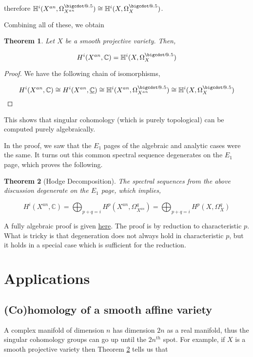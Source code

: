\documentclass[a4paper]{article}
\makeatletter
\newcommand{\C}{\mathbb{C}}
\newcommand*\bigcdot{\mathpalette\bigcdot@{.5}}
\newcommand*\bigcdot@[2]{\mathbin{\vcenter{\hbox{\scalebox{#2}{$\m@th#1\bullet$}}}}}
\newtheorem{theorem}{Theorem}
\numberwithin{theorem}{section}
\numberwithin{equation}{section}
\makeatother
\begin{document}
therefore $\mathbb{H}^i(X^{an},\Omega_{X^{an}}^{\bigcdot}) \cong \mathbb{H}^i(X,\Omega_{X}^{\bigcdot})$.


Combining all of these, we obtain

\begin{theorem}
    Let $X$ be a smooth projective variety. Then,

    $$ H^i(X^{an},\C) = \mathbb{H}^i(X,\Omega_{X}^{\bigcdot}) $$
\end{theorem}

\begin{proof}
    We have the following chain of isomorphisms,

    $$ H^i(X^{an},\C) \cong H^i(X^{an},\underline{\C}) \cong \mathbb{H}^i(X^{an}, \Omega_{X^{an}}^{\bigcdot}) \cong \mathbb{H}^i(X, \Omega_{X}^{\bigcdot}) $$
\end{proof}

This shows that singular cohomology (which is purely topological) can be computed purely algebraically. 

In the proof, we saw that the $E_1$ pages of the algebraic and analytic cases were the same. It turns out this common spectral sequence degenerates on the $E_1$ page, which proves the following.

\begin{theorem}[Hodge Decomposition] \label{Hodge}
    The spectral sequences from the above discussion degenerate on the $E_1$ page, which implies,

    $$ H^i(X^{an},\C) = \bigoplus_{p+q = i} H^p(X^{an},\Omega_{X^{an}}^q) = \bigoplus_{p+q = i} H^p(X,\Omega_{X}^q) $$
\end{theorem}

A fully algebraic proof is given \href{https://people.math.harvard.edu/~zyao/seminar/seminar/MHM/Hodge_Theory.pdf}{here}. The proof is by reduction to characteristic $p$. What is tricky is that degeneration does not always hold in characteristic $p$, but it holds in a special case which is sufficient for the reduction.

\section{Applications}

\subsection{(Co)homology of a smooth affine variety}

A complex manifold of dimension $n$ has dimension $2n$ as a real manifold, thus the singular cohomology groups can go up until the $2n^{th}$ spot. For example, if $X$ is a smooth projective variety then Theorem \ref{Hodge} tells us that
\end{document}
